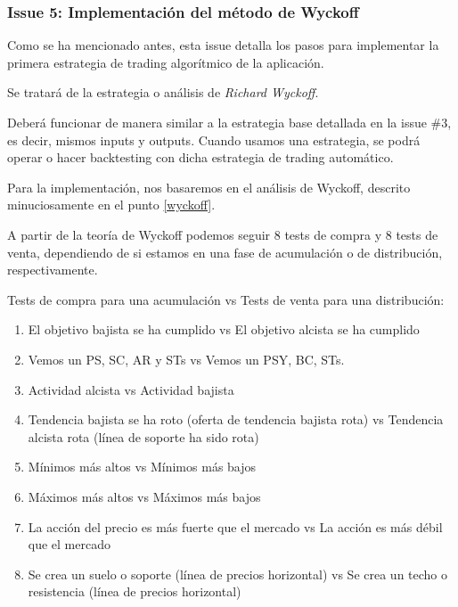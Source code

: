 \subsubsection{Issue 5: Implementación del método de Wyckoff}

Como se ha mencionado antes, esta issue detalla los pasos para implementar la primera estrategia de trading algorítmico de la aplicación. \newline

Se tratará de la estrategia o análisis de \textit{Richard Wyckoff}.\newline

Deberá funcionar de manera similar a la estrategia base detallada en la issue \#3, es decir, mismos inputs y outputs. Cuando usamos una estrategia, se podrá operar o hacer backtesting con dicha estrategia de trading automático. \newline

Para la implementación, nos basaremos en el análisis de Wyckoff, descrito minuciosamente en el punto \ref{wyckoff}.\newline

A partir de la teoría de Wyckoff podemos seguir 8 tests de compra y 8 tests de venta, dependiendo de si estamos en una fase de acumulación o de distribución, respectivamente.\newline

Tests de compra para una acumulación vs Tests de venta para una distribución:\newline

\begin{enumerate}
	\item El objetivo bajista se ha cumplido  vs  El objetivo alcista se ha cumplido
	\item Vemos un PS, SC, AR y STs  vs  Vemos un PSY, BC, STs.
	\item Actividad alcista vs Actividad bajista
	\item Tendencia bajista se ha roto (oferta de tendencia bajista rota)  vs  Tendencia alcista rota (línea de soporte ha sido rota)
	\item Mínimos más altos  vs  Mínimos más bajos
	\item Máximos más altos  vs  Máximos más bajos
	\item La acción del precio es más fuerte que el mercado  vs  La acción es más débil que el mercado
	\item Se crea un suelo o soporte (línea de precios horizontal)  vs  Se crea un techo o resistencia (línea de precios horizontal)
\end{enumerate}


